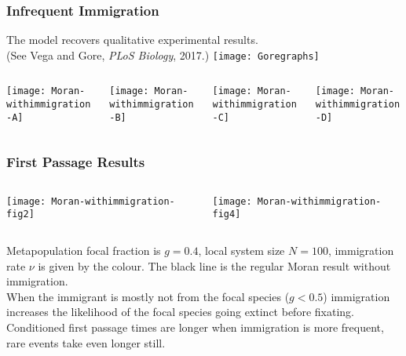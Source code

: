 \documentclass[dvipsnames]{beamer}
\begin{document}
\begin{frame}
\frametitle{Infrequent Immigration}
\centering
The model recovers qualitative experimental results. 
\\
(See Vega and Gore, \emph{PLoS Biology}, 2017.)
\texttt{[image: Goregraphs]}
\begin{columns}
\begin{column}{3cm}
\begin{center}
\texttt{[image: Moran-withimmigration-A]}
\end{center}
\end{column}
\begin{column}{3cm}
\begin{center}
\texttt{[image: Moran-withimmigration-B]}
\end{center}
\end{column}
\begin{column}{3cm}
\begin{center}
\texttt{[image: Moran-withimmigration-C]}
\end{center}
\end{column}
\begin{column}{3cm}
\begin{center}
\texttt{[image: Moran-withimmigration-D]}
\end{center}
\end{column}
\end{columns}
\end{frame}


\begin{frame}
\frametitle{First Passage Results}
\begin{columns}
\begin{column}{5.5cm}
\begin{center}
\texttt{[image: Moran-withimmigration-fig2]}
\end{center}
\end{column}
\begin{column}{5.5cm}
\begin{center}
\texttt{[image: Moran-withimmigration-fig4]}
\end{center}
\end{column}
\end{columns}
\justifying
\footnotesize{
Metapopulation focal fraction is $g=0.4$, local system size $N=100$, immigration rate $\nu$ is given by the colour. 
The black line is the regular Moran result without immigration. \\
When the immigrant is mostly not from the focal species ($g<0.5$) immigration increases the likelihood of the focal species going extinct before fixating. 
Conditioned first passage times are longer when immigration is more frequent, rare events take even longer still. 
}
\end{frame}
\end{document}
